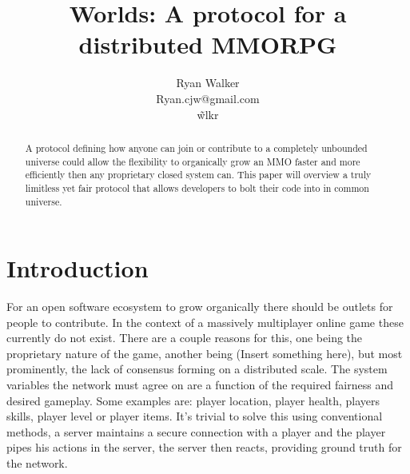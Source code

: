 \documentclass[runningheads,a4paper]{llncs}
\begin{document}
\def \SystemName {Worlds} %

\mainmatter  %

\title{\SystemName: A protocol for a distributed MMORPG}

\author{Ryan Walker\\
				Ryan.cjw@gmail.com\\
				\~wlkr}


\maketitle


%  

\begin{abstract}
A protocol defining how anyone can join or contribute to a completely unbounded universe could allow the flexibility to organically grow an MMO faster and more efficiently then any proprietary closed system can. This paper will overview a truly limitless yet fair protocol that allows developers to bolt their code into in common universe. 
\end{abstract}

\section{Introduction}
For an open software ecosystem to grow organically there should be outlets for people to contribute. In the context of a massively multiplayer online game these currently do not exist. There are a couple reasons for this, one being the proprietary nature of the game, another being (Insert something here), but most prominently, the lack of consensus forming on a distributed scale. The system variables the network must agree on are a function of the required fairness and desired gameplay. Some examples are: player location, player health, players skills, player level or player items. It's trivial to solve this using conventional methods, a server maintains a secure connection with a player and the player pipes his actions in the server, the server then reacts, providing ground truth for the network.
\end{document}
